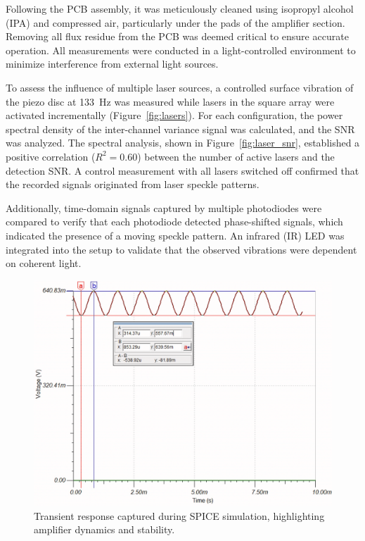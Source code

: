 Following the PCB assembly, it was meticulously cleaned using isopropyl alcohol (IPA) and compressed air, particularly under the pads of the amplifier section. 
Removing all flux residue from the PCB was deemed critical to ensure accurate operation. All measurements were conducted in a light-controlled environment to minimize interference from external light sources.

To assess the influence of multiple laser sources, a controlled surface vibration of the piezo disc at 133~Hz was measured while lasers in the square array were activated incrementally (Figure~\ref{fig:lasers}). 
For each configuration, the power spectral density of the inter-channel variance signal was calculated, and the SNR was analyzed. The spectral analysis, shown in Figure~\ref{fig:laser_snr}, 
established a positive correlation ($R^2 = 0.60$) between the number of active lasers and the detection SNR. 
A control measurement with all lasers switched off confirmed that the recorded signals originated from laser speckle patterns.

Additionally, time-domain signals captured by multiple photodiodes were compared to verify that each photodiode detected phase-shifted signals, which indicated the presence of a moving speckle pattern. 
An infrared (IR) LED was integrated into the setup to validate that the observed vibrations were dependent on coherent light.

\begin{figure}[t]
\centering
\includegraphics[width=\widthnarrow]{figures/eval/transient}
\caption{Transient response captured during SPICE simulation, highlighting amplifier dynamics and stability.}
\label{fig:transient}
\end{figure}


